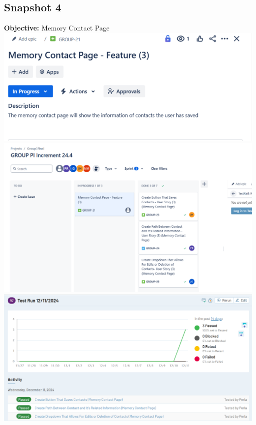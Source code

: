 \documentclass{article}
\begin{document}
\subsection{Snapshot 4}
\textbf{Objective:} Memory Contact Page\newline
\includegraphics{snapshot4img1.png}\newline
\includegraphics{snapshot4img2.png}
\includegraphics{snapshot4img3.png}
\end{document}
